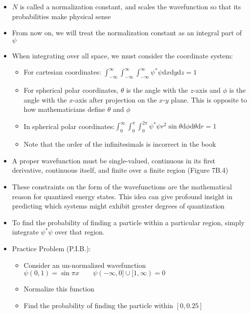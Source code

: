 \documentclass[12pt, openany, letterpaper]{memoir}
\begin{document}
\begin{itemize}
	\item $N$ is called a normalization constant, and scales the wavefunction so that its probabilities make physical sense
	\item From now on, we will treat the normalization constant as an integral part of $\psi$
	\item When integrating over all space, we must consider the coordinate system:
	\begin{itemize}
		\item For cartesian coordinates: $\displaystyle\int_{-\infty}^{\infty}\displaystyle\int_{-\infty}^{\infty}\displaystyle\int_{-\infty}^{\infty}\psi^{*}\psi\mathrm{d}x\mathrm{d}y\mathrm{d}z=1$
		\item For spherical polar coordinates, $\theta$ is the angle with the $z$-axis and $\phi$ is the angle with the $x$-axis after projection on the $x$-$y$ plane. This is opposite to how mathematicians define $\theta$ and $\phi$
		\item In spherical polar coordinates:$\displaystyle\int_{0}^{\infty}\displaystyle\int_{0}^{\pi}\displaystyle\int_{0}^{2\pi}\psi^{*}\psi r^2\sin\theta\mathrm{d}\phi\mathrm{d}\theta\mathrm{d}r=1$
		\item Note that the order of the infinitesimals is incorrect in the book
	\end{itemize}
	\item A proper wavefunction must be single-valued, continuous in its first derivative, continuous itself, and finite over a finite region (Figure 7B.4)
	\item These constraints on the form of the wavefunctions are the mathematical reason for quantized energy states. This idea can give profound insight in predicting which systems might exhibit greater degrees of quantization
	\item To find the probability of finding a particle within a particular region, simply integrate $\psi^*\psi$ over that region.
	\item Practice Problem (P.I.B.):
	\begin{itemize}
		\item Consider an un-normalized wavefunction $\psi(0,1) = \sin\pi x\hspace{2em}\psi(-\infty,0]\cup[1,\infty)=0$
		\item Normalize this function
		\item Find the probability of finding the particle within $[0,0.25]$
	\end{itemize}
\end{itemize}
\end{document}
